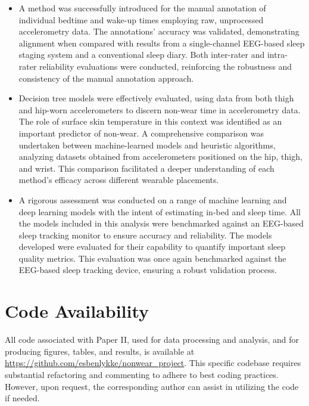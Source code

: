 \documentclass[
  10pt,
]{scrbook}
\begin{document}
\begin{itemize}
\item
  A method was successfully introduced for the manual annotation of
  individual bedtime and wake-up times employing raw, unprocessed
  accelerometry data. The annotations' accuracy was validated,
  demonstrating alignment when compared with results from a
  single-channel EEG-based sleep staging system and a conventional sleep
  diary. Both inter-rater and intra-rater reliability evaluations were
  conducted, reinforcing the robustness and consistency of the manual
  annotation approach.
\item
  Decision tree models were effectively evaluated, using data from both
  thigh and hip-worn accelerometers to discern non-wear time in
  accelerometry data. The role of surface skin temperature in this
  context was identified as an important predictor of non-wear. A
  comprehensive comparison was undertaken between machine-learned models
  and heuristic algorithms, analyzing datasets obtained from
  accelerometers positioned on the hip, thigh, and wrist. This
  comparison facilitated a deeper understanding of each method's
  efficacy across different wearable placements.
\item
  A rigorous assessment was conducted on a range of machine learning and
  deep learning models with the intent of estimating in-bed and sleep
  time. All the models included in this analysis were benchmarked
  against an EEG-based sleep tracking monitor to ensure accuracy and
  reliability. The models developed were evaluated for their capability
  to quantify important sleep quality metrics. This evaluation was once
  again benchmarked against the EEG-based sleep tracking device,
  ensuring a robust validation process.
\end{itemize}

\hypertarget{code-availability}{%
\chapter{Code Availability}\label{code-availability}}

All code associated with Paper II, used for data processing and
analysis, and for producing figures, tables, and results, is available
at \url{https://github.com/esbenlykke/nonwear_project}. This specific
codebase requires substantial refactoring and commenting to adhere to
best coding practices. However, upon request, the corresponding author
can assist in utilizing the code if needed.
\end{document}
